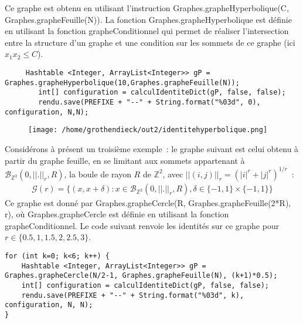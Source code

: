 \documentclass{article}
\begin{document}
Ce graphe est obtenu en utilisant l'instruction \textup{Graphes.grapheHyperbolique(C, Graphes.grapheFeuille(N))}. La fonction \textup{Graphes.grapheHyperbolique} est définie en utilisant la fonction \textup{grapheConditionnel} qui permet de réaliser l'intersection entre la structure d'un graphe et une condition sur les sommets de ce graphe (ici $x_1x_2\leq C$).
\begin{lstlisting}
     Hashtable <Integer, ArrayList<Integer>> gP = Graphes.grapheHyperbolique(10,Graphes.grapheFeuille(N));
        int[] configuration = calculIdentiteDict(gP, false, false);
        rendu.save(PREFIXE + "--" + String.format("%03d", 0), configuration, N,N);
\end{lstlisting}
\begin{figure}[h]
	\centering
	\texttt{[image: /home/grothendieck/out2/identitehyperbolique.png]}
\end{figure}
Considérons à présent un troisième exemple : le graphe suivant est celui obtenu à partir du graphe feuille, en se limitant aux sommets appartenant à $\mathcal{B}_{\mathbb{Z}^2}(0,||.||_r,R)$, la boule de rayon $R$ de $\mathbb{Z}^2$, avec $||(i,j)||_r= (|i|^r+|j|^r)^{1/r}$ :
\begin{align*}
	\mathcal{G}(r) = \{(x,x+\delta) : x\in\mathcal{B}_{\mathbb{Z}^2}(0,||.||_r, R), \delta\in\{-1,1\}\times\{-1,1\}\}
\end{align*}
Ce graphe est donné par \textup{Graphes.grapheCercle(R, Graphes.grapheFeuille(2*R), r)}, où \textup{Graphes.grapheCercle} est définie en utilisant la fonction \textup{grapheConditionnel}. Le code suivant renvoie les identités sur ce graphe pour $r \in\{0.5, 1, 1.5, 2, 2.5, 3\}$. 
\begin{lstlisting}
for (int k=0; k<6; k++) {
	Hashtable <Integer, ArrayList<Integer>> gP = Graphes.grapheCercle(N/2-1, Graphes.grapheFeuille(N), (k+1)*0.5);
	int[] configuration = calculIdentiteDict(gP, false, false);
	rendu.save(PREFIXE + "--" + String.format("%03d", k), configuration, N, N);
}
\end{lstlisting}
\begin{figure}[h]
\centering
{}
\qquad
{}
\qquad
{}
\qquad
{}
\qquad
\newline
{}
\qquad
{}
\end{figure}
\newpage
\end{document}
